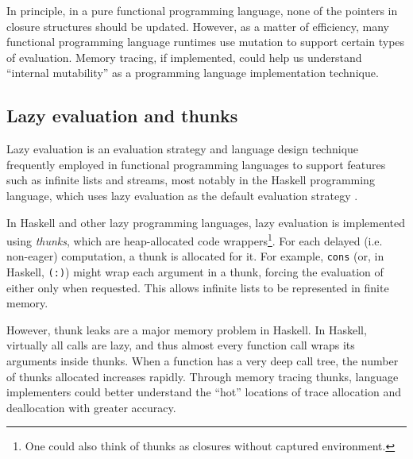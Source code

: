 \vspace*{5mm}
\begin{center}

\end{center}

In principle, in a pure functional programming language, none of the pointers in closure structures should be updated. However, as a matter of efficiency,
many functional programming language runtimes use mutation to support certain types of evaluation. Memory tracing, if implemented, could help us understand
``internal mutability'' as a programming language implementation technique.

\subsection{Lazy evaluation and thunks}
Lazy evaluation \citep{LazyEval} is an evaluation strategy and language design technique frequently employed in functional programming languages to support
features such as infinite lists and streams, most notably in the Haskell programming language, which uses lazy evaluation as the default evaluation strategy
\citep{Haskell}.

In Haskell and other lazy programming languages, lazy evaluation is implemented using \emph{thunks}, which are heap-allocated code wrappers\footnote{One could
  also think of thunks as closures without captured environment.}. For each delayed (i.e. non-eager) computation, a thunk is allocated for it. For example, 
\lstinline{cons} (or, in Haskell, \lstinline{(:)}) might wrap each argument in a thunk, forcing the evaluation of either only when requested. This allows
infinite lists to be represented in finite memory.

However, thunk leaks are a major memory problem in Haskell. In Haskell, virtually all calls are lazy, and thus almost every function call wraps its arguments
inside thunks. When a function has a very deep call tree, the number of thunks allocated increases rapidly. Through memory tracing thunks, language implementers
could better understand the ``hot'' locations of trace allocation and deallocation with greater accuracy.

